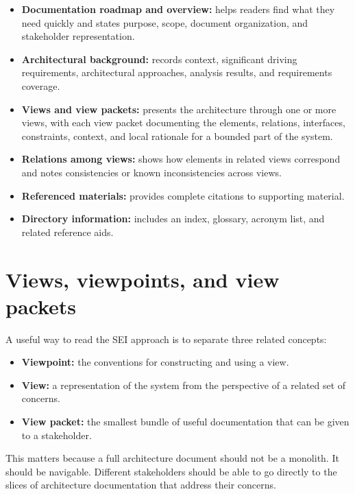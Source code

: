 \documentclass[11pt]{article}
\begin{document}
\begin{itemize}
    \item \textbf{Documentation roadmap and overview:} helps readers find what they need quickly and states purpose, scope, document organization, and stakeholder representation.\cite{sei-ref-standard}
    \item \textbf{Architectural background:} records context, significant driving requirements, architectural approaches, analysis results, and requirements coverage.\cite{sei-ref-standard}
    \item \textbf{Views and view packets:} presents the architecture through one or more views, with each view packet documenting the elements, relations, interfaces, constraints, context, and local rationale for a bounded part of the system.\cite{sei-ref-standard}
    \item \textbf{Relations among views:} shows how elements in related views correspond and notes consistencies or known inconsistencies across views.\cite{sei-ref-standard}
    \item \textbf{Referenced materials:} provides complete citations to supporting material.\cite{sei-ref-standard}
    \item \textbf{Directory information:} includes an index, glossary, acronym list, and related reference aids.\cite{sei-ref-standard}
\end{itemize}

\section*{Views, viewpoints, and view packets}

A useful way to read the SEI approach is to separate three related concepts:

\begin{itemize}
    \item \textbf{Viewpoint:} the conventions for constructing and using a view.
    \item \textbf{View:} a representation of the system from the perspective of a related set of concerns.
    \item \textbf{View packet:} the smallest bundle of useful documentation that can be given to a stakeholder.\cite{sei-ref-standard}
\end{itemize}

This matters because a full architecture document should not be a monolith. It should be navigable. Different stakeholders should be able to go directly to the slices of architecture documentation that address their concerns.\cite{sei-ref-standard}
\end{document}
